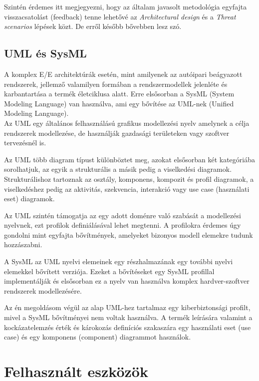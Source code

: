 Szintén érdemes itt megjegyezni, hogy az általam javasolt metodológia egyfajta visszacsatolást (feedback) tenne lehetővé az \textit{Architectural design} és a \textit{Threat scenarios} lépések közt. De erről később bővebben lesz szó.

\subsection{UML és SysML}

A komplex E/E architektúrák esetén, mint amilyenek az autóipari beágyazott rendszerek, jellemző valamilyen formában a rendszermodellek jelenléte és karbantartása a termék életciklusa alatt. Erre elsősorban a SysML (System Modeling Language) van használva, ami egy bővítése az UML-nek (Unified Modeling Language).\\

Az UML egy általános felhasználású grafikus modellezési nyelv amelynek a célja rendszerek modellezése, de használják gazdasági területeken vagy szoftver tervezésnél is.

Az UML több diagram típust különböztet meg, azokat elsősorban két kategóriába sorolhatjuk, az egyik a strukturális a másik pedig a viselkedési diagramok. Strukturálishoz tartoznak az osztály, komponens, kompozit és profil diagramok, a viselkedéshez pedig az aktivitás, szekvencia, interakció vagy use case (használati eset) diagramok.

Az UML szintén támogatja az egy adott doménre való szabását a modellezési nyelvnek, ezt profilok definiálásával lehet megtenni. A profilokra érdemes úgy gondolni mint egyfajta bővítmények, amelyeket bizonyos modell elemekre tudunk hozzászabni.


A SysML az UML nyelvi elemeinek egy részhalmazának egy további nyelvi elemekkel bővített verziója. Ezeket a bővítéseket egy SysML profillal implementálják és elsősorban ez a nyelv van használva komplex hardver-szoftver rendszerek modellezésére.


Az én megoldásom végül az alap UML-hez tartalmaz egy kiberbiztonsági profilt, mivel a SysML bővítményei nem voltak használva. A termék leírására valamint a kockázatelemzés érték és károkozás definíciós szakaszára egy használati eset (use case) és egy komponens (component) diagrammot használok.

\section{Felhasznált eszközök}

